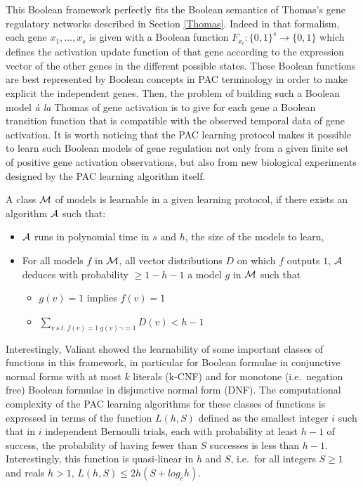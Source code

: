 \documentclass[graybox]{svmult}
\begin{document}
\begin{example}
  This Boolean framework perfectly fits the Boolean semantics of Thomas's gene regulatory networks described in Section \ref{Thomas}.
  Indeed in that formalism, each gene $x_1,\ldots,x_s$ is given with a Boolean function  $F_{x_i}:\{0,1\}^s \rightarrow\{0,1\}$
  which defines the activation update function of that gene
  according to the expression vector of the other genes in the different possible states.
  These Boolean functions are best represented by Boolean concepts in PAC terminology
  in order to make explicit the independent genes.
  Then, the problem of building such a Boolean model \emph{\`a la} Thomas of gene activation is to give for each gene
  a Boolean transition function that is compatible with the observed temporal data of gene activation.
It is worth noticing that the PAC learning protocol makes it possible to learn such Boolean models of gene regulation
not only from a given finite set of positive gene activation observations,
but also from new biological experiments designed by the PAC learning algorithm itself.
\end{example}

A class $\cal M$ of models is learnable in a given learning protocol, if there exists an algorithm $\cal A$ such that:
\begin{itemize}
  \item
$\cal A$ runs in polynomial time in $s$ and $h$, the size of the models to learn,
  \item
For all models $f$ in $\cal M$,
all vector distributions $D$ on which $f$ outputs $1$,
$\cal A$ deduces with probability $\ge 1-h-1$ a model $g$ in $\cal M$ such that
\begin{itemize}
  \item
$g(v)=1$ implies $f(v)=1$
\item
$\sum_{v\ s.t.~f(v)=1\ g(v)\neg=1} D(v) < h-1$
\end{itemize}
\end{itemize}


Interestingly, Valiant showed the learnability of some important classes of functions in this framework,
in particular for Boolean formulae in conjunctive normal forms with at most $k$ literals (k-CNF)
and for monotone (i.e.~negation free) Boolean formulae in disjunctive normal form (DNF).
The computational complexity of the PAC learning algorithms for these classes of functions is expressed in terms of the function
$L(h,S)$ defined as the smallest integer $i$ such that
in $i$ independent Bernoulli trials, each with probability at least $h-1$ of success, the probability of having fewer than $S$ successes is less than $h-1$.
Interestingly, this function is quasi-linear in $h$ and $S$, i.e.~for all integers $S\ge 1$ and reals $h>1$, $L(h,S) \le 2h(S+log_eh)$.
\end{document}
